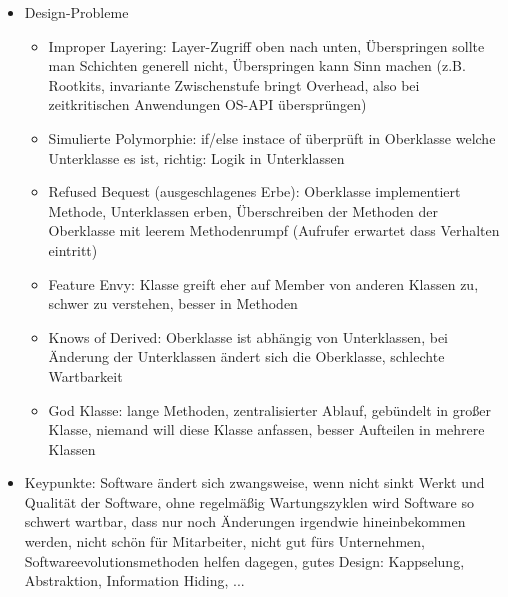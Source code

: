 \documentclass[paper=a4, fontsize=11pt]{scrartcl} %
\numberwithin{equation}{section} %
\numberwithin{figure}{section} %
\numberwithin{table}{section} %
\begin{document}
\begin{itemize}
  \item Design-Probleme
  \begin{itemize}
    \item Improper Layering: Layer-Zugriff oben nach unten, Überspringen sollte man Schichten generell nicht, Überspringen kann Sinn machen (z.B. Rootkits, invariante Zwischenstufe bringt Overhead, also bei zeitkritischen Anwendungen OS-API übersprüngen)
    \item Simulierte Polymorphie: if/else instace of überprüft in Oberklasse welche Unterklasse es ist, richtig: Logik in Unterklassen
    \item Refused Bequest (ausgeschlagenes Erbe): Oberklasse implementiert Methode, Unterklassen erben, Überschreiben der Methoden der Oberklasse mit leerem Methodenrumpf (Aufrufer erwartet dass Verhalten eintritt)
    \item Feature Envy: Klasse greift eher auf Member von anderen Klassen zu, schwer zu verstehen, besser in Methoden
    \item Knows of Derived: Oberklasse ist abhängig von Unterklassen, bei Änderung der Unterklassen ändert sich die Oberklasse, schlechte Wartbarkeit
    \item God Klasse: lange Methoden, zentralisierter Ablauf, gebündelt in großer Klasse, niemand will diese Klasse anfassen, besser Aufteilen in mehrere Klassen
  \end{itemize}
  \item Keypunkte: Software ändert sich zwangsweise, wenn nicht sinkt Werkt und Qualität der Software, ohne regelmäßig Wartungszyklen wird Software so schwert wartbar, dass nur noch Änderungen irgendwie hineinbekommen werden, nicht schön für Mitarbeiter, nicht gut fürs Unternehmen, Softwareevolutionsmethoden helfen dagegen, gutes Design: Kappselung, Abstraktion, Information Hiding, ...
\end{itemize}
\end{document}
